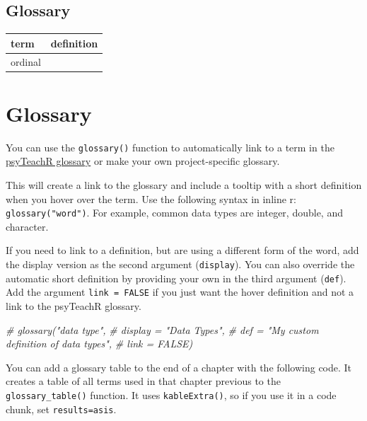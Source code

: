 \documentclass[
  oneside]{book}
\newenvironment{Shaded}{\begin{snugshade}}{\end{snugshade}}
\newcommand{\CommentTok}[1]{\textcolor[rgb]{0.56,0.35,0.01}{\textit{#1}}}
\begin{document}
\hypertarget{glossary}{%
\section{Glossary}\label{glossary}}

\begin{table}
\centering
\begin{tabular}{l|l}
\hline
term & definition\\
\hline
ordinal & \\
\hline
\end{tabular}
\end{table}

\hypertarget{glossary-1}{%
\chapter{Glossary}\label{glossary-1}}

You can use the \texttt{glossary()} function to automatically link to a term in the \href{https://psyteachr.github.io/glossary/}{psyTeachR glossary} or make your own project-specific glossary.

This will create a link to the glossary and include a tooltip with a short definition when you hover over the term. Use the following syntax in inline r: \texttt{glossary("word")}. For example, common data types{} are integer{}, double{}, and character{}.

If you need to link to a definition, but are using a different form of the word, add the display version as the second argument (\texttt{display}). You can also override the automatic short definition by providing your own in the third argument (\texttt{def}). Add the argument \texttt{link\ =\ FALSE} if you just want the hover definition and not a link to the psyTeachR glossary.

\begin{Shaded}
\begin{Highlighting}[]
\CommentTok{\# glossary("data type", }
\CommentTok{\#          display = "Data Types", }
\CommentTok{\#          def = "My custom definition of data types", }
\CommentTok{\#          link = FALSE)}
\end{Highlighting}
\end{Shaded}

You can add a glossary table to the end of a chapter with the following code. It creates a table of all terms used in that chapter previous to the \texttt{glossary\_table()} function. It uses \texttt{kableExtra()}, so if you use it in a code chunk, set \texttt{results=\textquotesingle{}asis\textquotesingle{}}.
\end{document}
